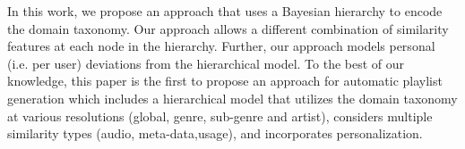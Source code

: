In this work, we propose an approach that uses a Bayesian hierarchy to encode the domain taxonomy.
Our approach allows a different combination of similarity features at each node in the hierarchy. Further, our approach models personal (i.e. per user) deviations from the hierarchical model.
To the best of our knowledge, this paper is the first to propose an approach for automatic  playlist generation which includes a hierarchical model that utilizes the domain taxonomy at various resolutions (global, genre, sub-genre and artist), considers multiple similarity types (audio, meta-data,usage), and incorporates personalization.





%
%
%  	
%
